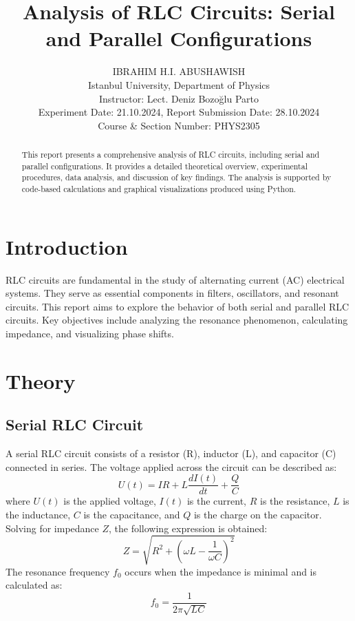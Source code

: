 \documentclass[journal]{IEEEtran}
\begin{document}
\title{Analysis of RLC Circuits: Serial and Parallel Configurations}
\author{IBRAHIM H.I. ABUSHAWISH \\
Istanbul University, Department of Physics \\
Instructor: Lect. Deniz Bozo\u{g}lu Parto \\
Experiment Date: 21.10.2024, Report Submission Date: 28.10.2024\\
Course \& Section Number: PHYS2305}

\maketitle

\begin{abstract}
This report presents a comprehensive analysis of RLC circuits, including serial and parallel configurations. It provides a detailed theoretical overview, experimental procedures, data analysis, and discussion of key findings. The analysis is supported by code-based calculations and graphical visualizations produced using Python.
\end{abstract}

\section{Introduction}
RLC circuits are fundamental in the study of alternating current (AC) electrical systems. They serve as essential components in filters, oscillators, and resonant circuits. This report aims to explore the behavior of both serial and parallel RLC circuits. Key objectives include analyzing the resonance phenomenon, calculating impedance, and visualizing phase shifts.

\section{Theory}

\subsection{Serial RLC Circuit}
A serial RLC circuit consists of a resistor (R), inductor (L), and capacitor (C) connected in series. The voltage applied across the circuit can be described as:
\begin{equation}
    U(t) = IR + L\frac{dI(t)}{dt} + \frac{Q}{C}
\end{equation}
where $U(t)$ is the applied voltage, $I(t)$ is the current, $R$ is the resistance, $L$ is the inductance, $C$ is the capacitance, and $Q$ is the charge on the capacitor. Solving for impedance $Z$, the following expression is obtained:
\begin{equation}
    Z = \sqrt{R^2 + \left(\omega L - \frac{1}{\omega C}\right)^2}
\end{equation}
The resonance frequency $f_0$ occurs when the impedance is minimal and is calculated as:
\begin{equation}
    f_0 = \frac{1}{2\pi \sqrt{LC}}
\end{equation}
\end{document}
